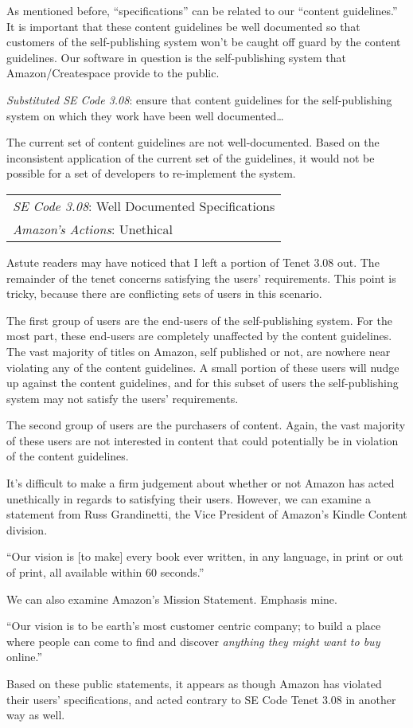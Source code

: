 \documentclass[10pt]{article}
\begin{document}
\begin{multicols}{2}
As mentioned before, ``specifications'' can be related to our ``content guidelines.''  It is important that these content guidelines be well documented so that customers of the self-publishing system won't be caught off guard by the content guidelines.  Our software in question is the self-publishing system that Amazon/Createspace provide to the public.

\emph{Substituted SE Code 3.08}: ensure that content guidelines for the self-publishing system on which they work have been well documented\ldots

The current set of content guidelines are not well-documented.  Based on the inconsistent application of the current set of the guidelines, it would not be possible for a set of developers to re-implement the system.

\begin{tabular}{| l |}
\hline
\emph{SE Code 3.08}: Well Documented Specifications \\
\emph{Amazon's Actions}: Unethical \\
\hline
\end{tabular}

Astute readers may have noticed that I left a portion of Tenet 3.08 out.  The remainder of the tenet concerns satisfying the users' requirements. This point is tricky, because there are conflicting sets of users in this scenario.  

The first group of users are the end-users of the self-publishing system.  For the most part, these end-users are completely unaffected by the content guidelines.  The vast majority of titles on Amazon, self published or not, are nowhere near violating any of the content guidelines.  A small portion of these users will nudge up against the content guidelines, and for this subset of users the self-publishing system may not satisfy the users' requirements.

The second group of users are the purchasers of content.  Again, the vast majority of these users are not interested in content that could potentially be in violation of the content guidelines.  

It's difficult to make a firm judgement about whether or not Amazon has acted unethically in regards to satisfying their users.  However, we can examine a statement from Russ Grandinetti, the Vice President of Amazon's Kindle Content division.

``Our vision is [to make] every book ever written, in any language, in print or out of print, all available within 60 seconds.'' \cite{LATimesRussQuote}

We can also examine Amazon's Mission Statement. Emphasis mine.

``Our vision is to be earth's most customer centric company; to build a place where people can come to find and discover \emph{anything they might want to buy} online.'' \cite{AmazonIRFAQ}

Based on these public statements, it appears as though Amazon has violated their users' specifications, and acted contrary to SE Code Tenet 3.08 in another way as well.

\end{multicols}

\newpage





\end{document}
